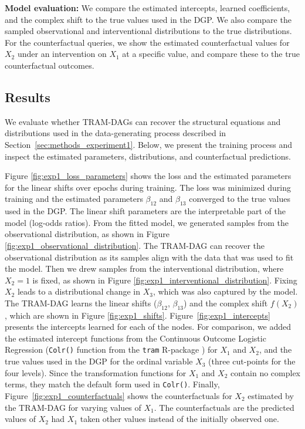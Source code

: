 \textbf{Model evaluation: } We compare the estimated intercepts, learned coefficients, and the complex shift to the true values used in the DGP. We also compare the sampled observational and interventional distributions to the true distributions. For the counterfactual queries, we show the estimated counterfactual values for $X_2$ under an intervention on $X_1$ at a specific value, and compare these to the true counterfactual outcomes.




\subsection{Results}



We evaluate whether TRAM-DAGs can recover the structural equations and distributions used in the data-generating process described in Section~\ref{sec:methods_experiment1}. Below, we present the training process and inspect the estimated parameters, distributions, and counterfactual predictions.

Figure \ref{fig:exp1_loss_parameters} shows the loss and the estimated parameters for the linear shifts over epochs during training. The loss was minimized during training and the estimated parameters $\beta_{12}$ and $\beta_{13}$ converged to the true values used in the DGP. The linear shift parameters are the interpretable part of the model (log-odds ratios). From the fitted model, we generated samples from the observational distribution, as shown in Figure \ref{fig:exp1_observational_distribution}. The TRAM-DAG can recover the observational distribution as its samples align with the data that was used to fit the model. Then we drew samples from the interventional distribution, where $X_2 = 1$ is fixed, as shown in Figure \ref{fig:exp1_interventional_distribution}. Fixing $X_2$ leads to a distributional change in $X_3$, which was also captured by the model. The TRAM-DAG learns the linear shifts ($\beta_{12}$, $\beta_{13}$) and the complex shift $f(X_2)$, which are shown in Figure \ref{fig:exp1_shifts}. Figure~\ref{fig:exp1_intercepts} presents the intercepts learned for each of the nodes. For comparison, we added the estimated intercept functions from the Continuous Outcome Logistic Regression (\texttt{Colr()} function from the \texttt{tram} R-package \citep{hothorn2018}) for $X_1$ and $X_2$, and the true values used in the DGP for the ordinal variable $X_3$ (three cut-points for the four levels). Since the transformation functions for $X_1$ and $X_2$ contain no complex terms, they match the default form used in \texttt{Colr()}. Finally, Figure~\ref{fig:exp1_counterfactuals} shows the counterfactuals for $X_2$ estimated by the TRAM-DAG for varying values of $X_1$. The counterfactuals are the predicted values of $X_2$ had $X_1$ taken other values instead of the initially observed one. 

